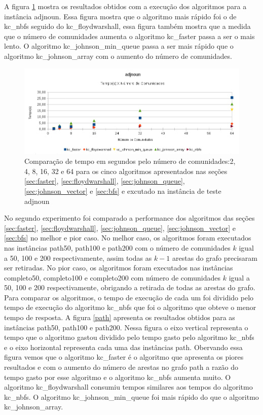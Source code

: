 A figura \ref{adjnoun} mostra os resultados obtidos com a execução dos algoritmos para a instância adjnoun. Essa figura mostra
que o algoritmo mais rápido foi o de kc\_nbfs seguido do kc\_floydwarshall, essa figura também mostra que a medida
que o número de comunidades aumenta o algoritmo kc\_faster passa a ser o mais lento. O algoritmo kc\_johnson\_min\_queue
passa a ser mais rápido que o algoritmo kc\_johnson\_array com o aumento do número de comunidades.

\begin{figure}
\centering
\includegraphics[width=6in]{adjnoun.png}
\caption{Comparação de tempo em segundos pelo número de comunidades:2, 4, 8, 16, 32 e 64 para os cinco algoritmos apresentados nas seções \ref{sec:faster}, \ref{sec:floydwarshall}, \ref{sec:johnson_queue}, \ref{sec:johnson_vector} e \ref{sec:bfs} e excutado na instância de teste adjnoun}
\label{adjnoun}
\end{figure}

No segundo experimento foi comparado a performance dos algoritmos das seções \ref{sec:faster}, \ref{sec:floydwarshall}, \ref{sec:johnson_queue}, \ref{sec:johnson_vector} e \ref{sec:bfs} no melhor e pior caso. No melhor caso, os algoritmos foram
executados nas instâncias path50, path100 e path200 com o número de comunidades $k$ igual a 50, 100 e 200 respectivamente, assim
todas as $k - 1$ arestas do grafo precisaram ser retiradas. No pior caso, os algoritmos foram executados nas instâncias completo50, completo100 e completo200 com número de comunidades $k$ igual a 50, 100 e 200 respectivamente, obrigando a
retirada de todas as arestas do grafo. Para comparar os algoritmos, o tempo de execução de cada um foi dividido pelo tempo 
de execução do algoritmo kc\_nbfs que foi o algoritmo que obteve o menor tempo de resposta.
A figura \ref{path} apresenta os resultados obtidos para as instâncias path50, path100 e path200.  Nessa figura o eixo
vertical representa o tempo que o algoritmo gastou dividido pelo tempo gasto pelo algoritmo kc\_nbfs e o eixo horizontal
representa cada uma das instâncias path. Obervando essa figura vemos que o algoritmo kc\_faster é o algoritmo que apresenta os piores resultados e com o aumento do número de arestas no grafo path a razão do tempo gasto por esse algoritmo e o algoritmo kc\_nbfs aumenta muito. O algoritmo kc\_floydwarshall consumiu tempos similares aos tempos do algoritmo kc\_nbfs. O algoritmo
kc\_johnson\_min\_queue foi mais rápido do que o algoritmo kc\_johnson\_array.

